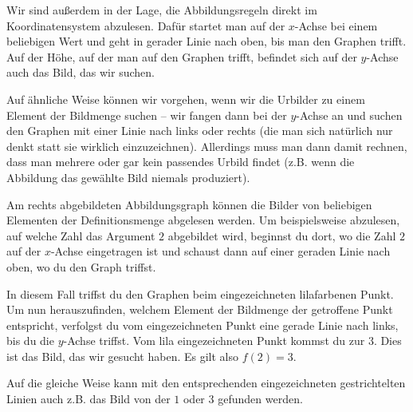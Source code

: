 \documentclass[../../main.tex]{subfiles}
\begin{document}
Wir sind außerdem in der Lage, die Abbildungsregeln direkt im Koordinatensystem abzulesen. Dafür startet man auf der $x$-Achse bei einem beliebigen Wert und geht in gerader Linie nach oben, bis man den Graphen trifft. Auf der Höhe, auf der man auf den Graphen trifft, befindet sich auf der $y$-Achse auch das Bild, das wir suchen.

Auf ähnliche Weise können wir vorgehen, wenn wir die Urbilder zu einem Element der Bildmenge suchen -- wir fangen dann bei der $y$-Achse an und suchen den Graphen mit einer Linie nach links oder rechts (die man sich natürlich nur denkt statt sie wirklich einzuzeichnen). Allerdings muss man dann damit rechnen, dass man mehrere oder gar kein passendes Urbild findet (z.B. wenn die Abbildung das gewählte Bild niemals produziert).

\begin{example}
    \parpic[r]{
    }
    
    Am rechts abgebildeten Abbildungsgraph können die Bilder von beliebigen Elementen der Definitionsmenge abgelesen werden. Um beispielsweise abzulesen, auf welche Zahl das Argument $2$ abgebildet wird, beginnst du dort, wo die Zahl $2$ auf der $x$-Achse eingetragen ist und schaust dann auf einer geraden Linie nach oben, wo du den Graph triffst.
    
    In diesem Fall triffst du den Graphen beim eingezeichneten lilafarbenen Punkt. Um nun herauszufinden, welchem Element der Bildmenge der getroffene Punkt entspricht, verfolgst du vom eingezeichneten Punkt eine gerade Linie nach links, bis du die $y$-Achse triffst. Vom lila eingezeichneten Punkt kommst du zur $3$. Dies ist das Bild, das wir gesucht haben. Es gilt also $f(2)=3$.
    
    Auf die gleiche Weise kann mit den entsprechenden eingezeichneten gestrichtelten Linien auch z.B. das Bild von der $1$ oder $3$ gefunden werden.
\end{example}
\end{document}

